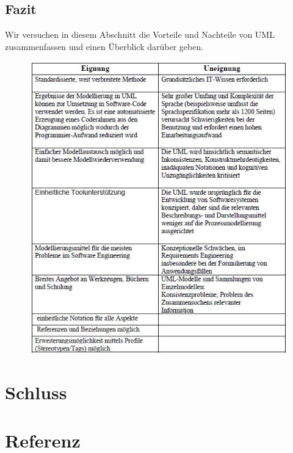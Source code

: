 \subsection{Fazit}

Wir versuchen in diesem Abschnitt die Vorteile und Nachteile von UML zusammenfassen und einen Überblick darüber geben.

\begin{center}
\begin{figure}[h]
   
\includegraphics[scale=1]{Graphics/vornachteil.jpg} 



\label{fig11}


\end{figure}
\end{center}
\newpage



\section{Schluss}


\section{Referenz}




